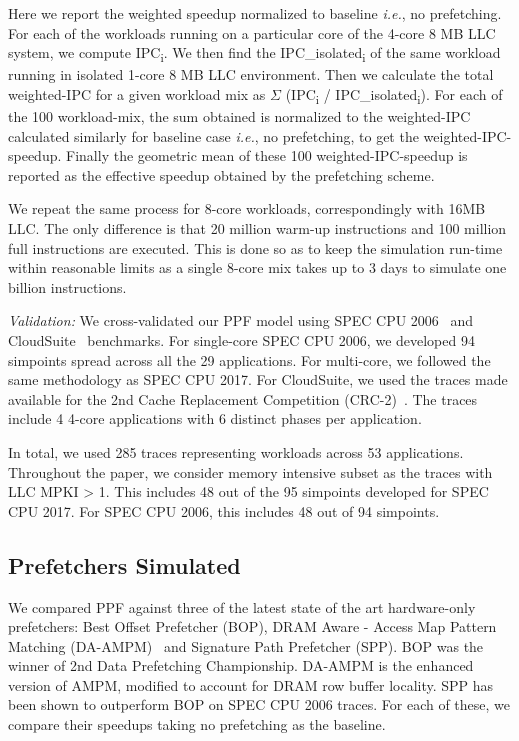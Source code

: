 Here we report the weighted speedup normalized to baseline
\textit{i.e.}, no prefetching.  For each of the workloads running on a
particular core of the 4-core 8 MB LLC system, we compute
IPC\textsubscript{i}.  We then find the IPC\_isolated\textsubscript{i}
of the same workload running in isolated 1-core 8 MB LLC environment.
Then we calculate the total weighted-IPC for a given workload mix as
$\Sigma$ (IPC\textsubscript{i} / IPC\_isolated\textsubscript{i}).  For
each of the 100 workload-mix, the sum obtained is normalized to the
weighted-IPC calculated similarly for baseline case \textit{i.e.}, no
prefetching, to get the weighted-IPC-speedup.  Finally the geometric
mean of these 100 weighted-IPC-speedup is reported as the effective
speedup obtained by the prefetching scheme.

We repeat the same process for 8-core workloads, correspondingly with 16MB
LLC.  The only difference is that 20 million warm-up instructions and 100
million full instructions are executed.  This is done so as to keep the
simulation run-time within reasonable limits as a single 8-core mix takes up
to 3 days to simulate one billion instructions.

\textit{Validation:} We cross-validated our PPF model using SPEC
CPU 2006~\cite{SPEC2006} and CloudSuite~\cite{CloudSuite} benchmarks.  For
single-core SPEC CPU 2006, we developed 94 simpoints spread across all the 29
applications. For multi-core, we followed the same methodology as SPEC CPU 2017.
For CloudSuite, we used the traces made available for the 2nd Cache
Replacement Competition (CRC-2)~\cite{CRC_2}.  The traces include 4 4-core
applications with 6 distinct phases per application.

In total, we used 285 traces representing workloads across 53 applications.
Throughout the paper, we consider memory intensive subset as the
traces with LLC MPKI > 1.  This includes 48 out of the 95 simpoints
developed for SPEC CPU 2017. For SPEC CPU 2006, this includes 48 out of 94 simpoints.

\subsection{Prefetchers Simulated}
\label{Method-Prefetchers}
We compared PPF against three of the latest state of the art hardware-only
prefetchers: Best Offset Prefetcher (BOP), DRAM Aware - Access Map Pattern
Matching (DA-AMPM)~\cite{DA_AMPM} and Signature Path Prefetcher (SPP).  BOP was
the winner of 2nd Data Prefetching Championship.  DA-AMPM is the enhanced
version of AMPM, modified to account for DRAM row buffer locality.  SPP has
been shown to outperform BOP on SPEC CPU 2006 traces.  For each of these, we
compare their speedups taking no prefetching as the baseline.


